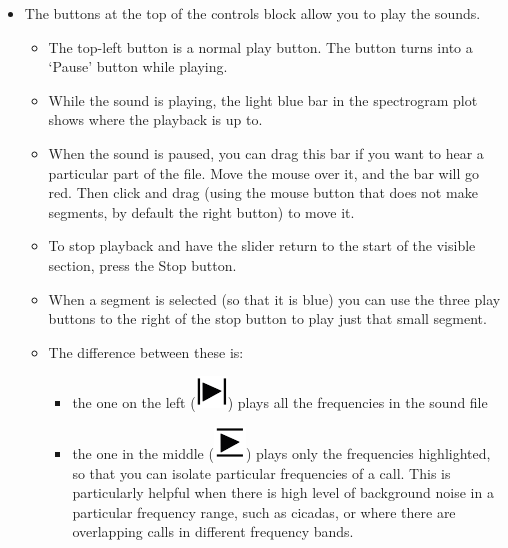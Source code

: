\documentclass{article}
\begin{document}
\begin{itemize}
\item The buttons at the top of the controls block allow you to play the sounds. 

\begin{itemize}
\item The top-left button is a normal play button. The button turns into a `Pause' button while playing.  
\item While the sound is playing, the light blue bar in the spectrogram plot shows where the playback is up to. 
\item When the sound is paused, you can drag this bar if you want to hear a particular part of the file. Move the mouse over it, and the bar will go red. Then click and drag (using the mouse button that does not make segments, by default the right button) to move it. 
\item To stop playback and have the slider return to the start of the visible section, press the Stop button.
\item When a segment is selected (so that it is blue) you can use the three play buttons to the right of the stop button to play just that small segment. 
\item The difference between these is:
    \begin{itemize} 
    \item the one on the left (\includegraphics[scale=0.3]{Figures/playsegment}) plays all the frequencies in the sound file
    \item the one in the middle (\includegraphics[scale=0.3]{Figures/playBandLimited}) plays only the frequencies highlighted, so that you can isolate particular frequencies of a call. This is particularly helpful when there is high level of background noise in a particular frequency range, such as cicadas, or where there are overlapping calls in different frequency bands.

\end{itemize}
\end{itemize}
\end{itemize}
\end{document}
